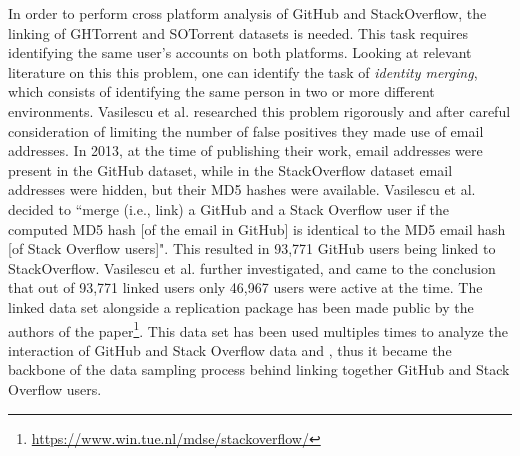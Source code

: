         In order to perform cross platform analysis of GitHub and StackOverflow, the linking of GHTorrent and SOTorrent datasets is needed. This task requires identifying the same user's accounts on both platforms. Looking at relevant literature on this this problem, one can identify the task of \textit{identity merging}, which consists of identifying the same person in two or more different environments. Vasilescu et al. \cite{vasilescu2013stackoverflow} researched this problem rigorously and after careful consideration of limiting the number of false positives they made use of email addresses. In 2013, at the time of publishing their work, email addresses were present in the GitHub dataset, while in the StackOverflow dataset email addresses were hidden, but their MD5 hashes were available. Vasilescu et al. \cite{vasilescu2013stackoverflow} decided to ``merge (i.e., link) a GitHub and a Stack Overflow user if the computed MD5 hash [of the email in GitHub] is identical to the MD5 email hash [of Stack Overflow users]". This resulted in 93,771 GitHub users being linked to StackOverflow. Vasilescu et al. \cite{vasilescu2013stackoverflow} further investigated, and came to the conclusion that out of 93,771 linked users only 46,967 users were active at the time. The linked data set alongside a replication package has been made public by the authors of the paper\footnote{\label{bodgan_dataset}\url{https://www.win.tue.nl/mdse/stackoverflow/}}. This data set has been used multiples times to analyze the interaction of GitHub and Stack Overflow data \cite{badashian2014involvement} and \cite{lee2017github}, thus it became the backbone of the data sampling process behind linking together GitHub and Stack Overflow users.  

